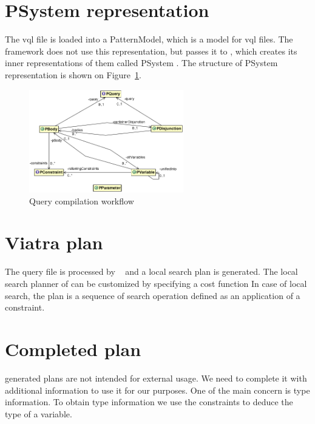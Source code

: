 \section{PSystem representation}
The vql file is loaded into a PatternModel, which is a model for vql files. 
The framework does not use this representation, but passes it to \viatra, which creates its inner representations of them called PSystem \cite{psystem}. The structure of PSystem representation is shown on Figure~\ref{fig:psystem}.

\begin{figure}[h]
	\begin{center}
		\includegraphics[width=0.6\textwidth]{figures/psystem.png}
		\caption{Query compilation workflow}
		\label{fig:psystem}
	\end{center}
\end{figure}

\section{Viatra plan}

The query file is processed by \viatra{}~\cite{viatra} and a local search plan is generated. 
The local search planner of \viatra{} can be customized by specifying a cost function
In case of local search, the plan is a sequence of search operation defined as an application of a constraint.

\section{Completed plan}

\viatra{} generated plans are not intended for external usage. 
We need to complete it with additional information to use it for our purposes. 
One of the main concern is type information. To obtain type information we use the constraints to deduce the type of a variable. 


